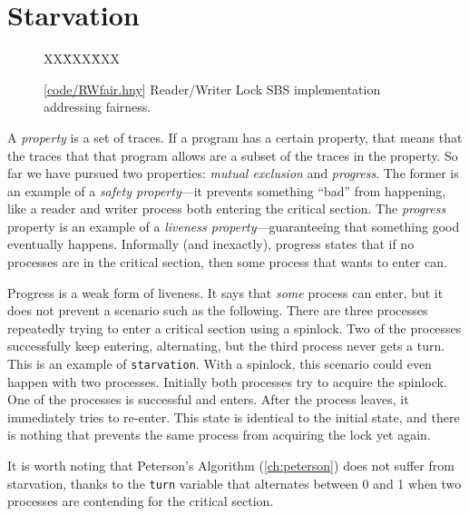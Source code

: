 \documentclass{report}
\newcommand{\harmonysource}[1]{
\begin{tabbing}
XX\=XXX\=XXX\kill
    
\end{tabbing}
}
\newcommand{\harmonylink}[1]{%
[\href{https://www.cs.cornell.edu/home/rvr/harmony/#1}{\underline{#1}}]%
}
\newenvironment{code}{
\tcolorbox
}{
\endtcolorbox
}
\begin{document}
\chapter{Starvation}
\label{ch:starvation}
%

%

\begin{figure}
\begin{code}
{\small
\harmonysource{RWfair}
}
\end{code}
\caption{\harmonylink{code/RWfair.hny} Reader/Writer Lock SBS implementation addressing fairness.}
\label{fig:RWfair}
\end{figure}

%

A \emph{property}
%
is a set of traces.
If a program has a certain property, that means that the traces that that
program allows are a subset of the traces in the property.
So far we have pursued two properties: \emph{mutual exclusion}
and \emph{progress}.  The former is an example of a
\emph{safety property}---it prevents something ``bad'' from
happening, like a reader and writer process both entering the
critical section.  The \emph{progress} property is an example
of a \emph{liveness property}---guaranteeing that something good
eventually happens.
Informally (and inexactly), progress states that if no processes
are in the critical section, then some process that wants to enter
can.

Progress is a weak form of liveness.  It says that \emph{some}
process can enter, but it does not prevent a scenario such as
the following.  There are three processes repeatedly trying to
enter a critical section using a spinlock.  Two of
the processes successfully keep entering, alternating, but the third
process never gets a turn.  This is an example of
\texttt{starvation}.  With a spinlock, this scenario could
even happen with two processes.  Initially both processes
try to acquire the spinlock.  One of the processes is
successful and enters.  After the process leaves, it immediately
tries to re-enter.  This state is identical to the initial
state, and there is nothing that prevents the same process
from acquiring the lock yet again.

It is worth noting that Peterson's Algorithm (\autoref{ch:peterson})
does not suffer from starvation, thanks to the \texttt{turn} variable
that alternates between 0 and 1 when two processes are contending for
the critical section.
\end{document}
